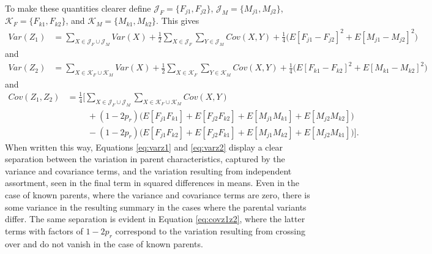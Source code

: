 \documentclass{article}
\begin{document}
To make these quantities clearer define $\mathcal{J}_{F} = \{F_{j1}, F_{j2}\}$, $\mathcal{J}_{M} = \{M_{j1}, M_{j2}\}$, $\mathcal{K}_{F} = \{F_{k1}, F_{k2}\}$, and $\mathcal{K}_M = \{M_{k1}, M_{k2}\}$. This gives
\begin{align}
  Var(Z_1) & = \sum_{X \in \mathcal{J}_F \cup \mathcal{J}_M} Var(X) + \frac{1}{2} \sum_{X \in \mathcal{J}_F} \sum_{Y \in \mathcal{J}_M} Cov(X, Y) + \frac{1}{4} \Big ( E[F_{j1} - F_{j2}]^2 + E[M_{j1} - M_{j2}]^2 \Big ) \label{eq:varz1}
\end{align}
and
\begin{align}
  Var(Z_2) & = \sum_{X \in \mathcal{K}_F \cup \mathcal{K}_M} Var(X) + \frac{1}{2} \sum_{X \in \mathcal{K}_F} \sum_{Y \in \mathcal{K}_M} Cov(X, Y) + \frac{1}{4} \Big ( E[F_{k1} - F_{k2}]^2 +  E[M_{k1} - M_{k2}]^2 \Big ) \label{eq:varz2}
\end{align}
and
\begin{align}
  Cov(Z_1, Z_2) & = \frac{1}{4} \Bigg [ \sum_{X \in \mathcal{J}_F \cup \mathcal{J}_M} \sum_{X \in \mathcal{K}_F \cup \mathcal{K}_M} Cov(X, Y)  \nonumber \\
                & \hspace{1cm} + (1 - 2p_r) \Big ( E[F_{j1} F_{k1}] + E[F_{j2} F_{k2}] + E[M_{j1} M_{k1}] + E[M_{j2} M_{k2}] \Big ) \nonumber \\
                & \hspace{1cm}  - (1 - 2p_r) \Big ( E[F_{j1} F_{k2}] + E[F_{j2} F_{k1}] + E[M_{j1} M_{k2}] + E[M_{j2} M_{k1}] \Big ) \Bigg ]. \label{eq:covz1z2}
\end{align}
When written this way, Equations \ref{eq:varz1} and \ref{eq:varz2} display a clear separation between the variation in parent characteristics, captured by the variance and covariance terms, and the variation resulting from independent assortment, seen in the final term in squared differences in means. Even in the case of known parents, where the variance and covariance terms are zero, there is some variance in the resulting summary in the cases where the parental variants differ. The same separation is evident in Equation \ref{eq:covz1z2}, where the latter terms with factors of $1 - 2 p_r$ correspond to the variation resulting from crossing over and do not vanish in the case of known parents.



\renewcommand*{\bibname}{References} %

\end{document}
